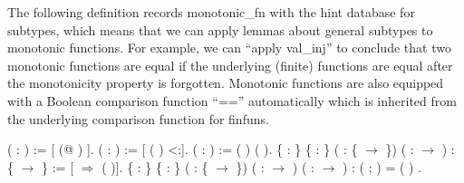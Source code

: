 \documentclass[12pt]{report}
\begin{document}
The following definition records monotonic\_fn with the hint database for subtypes, which means that we can apply lemmas about general subtypes to monotonic functions. For example, we can ``apply val\_inj'' to conclude that two monotonic functions are equal if the underlying (finite) functions are equal after the monotonicity property is forgotten. Monotonic functions are also equipped with a Boolean comparison function ``=='' automatically which is inherited from the underlying comparison function for finfuns. 
\begin{coqdoccode}
\coqdocemptyline
\coqdocnoindent
{}   (  : ) :=\coqdoceol
\coqdocindent{1.00em}
[  (@  ) ].\coqdoceol
\coqdocnoindent
{}  (  : ) :=\coqdoceol
\coqdocindent{1.00em}
[  (  )  <:].\coqdoceol
\coqdocnoindent
{}   (  : ) :=\coqdoceol
\coqdocindent{1.00em}
 (  ) (  ).\coqdoceol
\coqdocemptyline
\coqdocnoindent
{}  \{ : \} \{  : \} ( : \{  \ensuremath{\rightarrow} \})\coqdoceol
\coqdocindent{1.00em}
( :  \ensuremath{\rightarrow} ) \coqdoceol
\coqdocindent{1.00em}
: \{  \ensuremath{\rightarrow} \}\coqdoceol
\coqdocindent{1.00em}
:=  [  \ensuremath{\Rightarrow}  ( )].\coqdoceol
\coqdocemptyline
\coqdocnoindent
{}  \{ : \} \{  : \}\coqdoceol
\coqdocindent{1.00em}
( : \{  \ensuremath{\rightarrow} \}) ( :  \ensuremath{\rightarrow} ) ( :  \ensuremath{\rightarrow} )\coqdoceol
\coqdocindent{1.00em}
:   ( ; ) =  (  ) .\coqdoceol

\end{coqdoccode}
\end{document}
